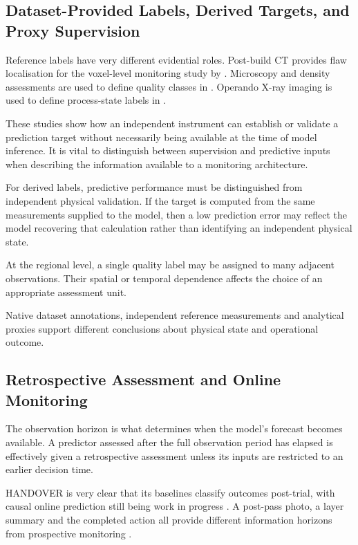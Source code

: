 \subsection{Dataset-Provided Labels, Derived Targets, and Proxy Supervision}

Reference labels have very different evidential roles. Post-build CT provides flaw localisation for
the voxel-level monitoring study by \textcite{petrich_multi-modal_2021}. Microscopy and
density assessments are used to define quality classes in \textcite{li_feature-level_2022}. Operando X-ray
imaging is used to define process-state labels in \textcite{pandiyan_deep_2022}.

These studies show how an independent instrument can establish or validate a prediction target
without necessarily being available at the time of model inference. It is vital to distinguish
between supervision and predictive inputs when describing the information available to a monitoring
architecture.

For derived labels, predictive performance must be distinguished from independent physical
validation. If the target is computed from the same measurements supplied to the model, then a low
prediction error may reflect the model recovering that calculation rather than identifying an
independent physical state.

At the regional level, a single quality label may be assigned to many adjacent observations. Their
spatial or temporal dependence affects the choice of an appropriate assessment unit.

Native dataset annotations, independent reference measurements and analytical proxies support different conclusions about physical state and operational outcome.

\subsection{Retrospective Assessment and Online Monitoring}

The observation horizon is what determines when the model's forecast becomes available. A predictor
assessed after the full observation period has elapsed is effectively given a retrospective
assessment unless its inputs are restricted to an earlier decision time.

HANDOVER is very clear that its baselines classify outcomes post-trial, with causal online
prediction still being work in progress \parencite[p.~7, Section~VI]{thoduka_multimodal_2024}. A
post-pass photo, a layer summary and the completed action all provide different information horizons
from prospective monitoring \parencite{zhang_tool_2026,petrich_multi-modal_2021}.

